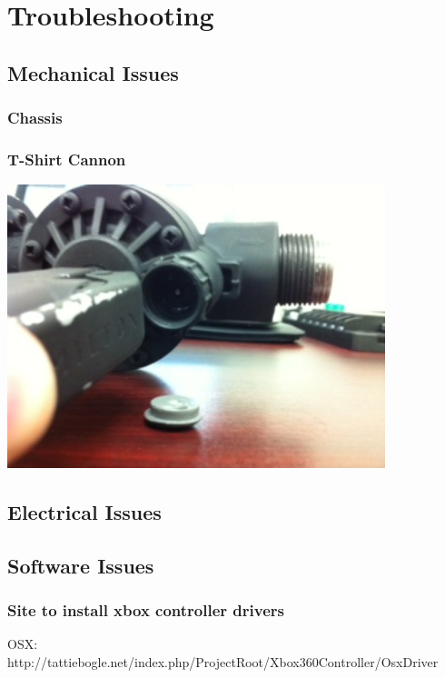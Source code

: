 \documentclass[letterpaper,12pt]{article}
\begin{document}
\section{Troubleshooting}

\subsection{Mechanical Issues}
\subsubsection{Chassis}
\subsubsection{T-Shirt Cannon}

\begin{center}
    \includegraphics[width=11cm]{pics/cannon/broken_release_valve.jpg}
\end{center}

\subsection{Electrical Issues}

\subsection{Software Issues}
\subsubsection{Site to install xbox controller drivers}
OSX: http://tattiebogle.net/index.php/ProjectRoot/Xbox360Controller/OsxDriver
\end{document}
